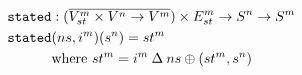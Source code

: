 \documentclass[preview]{standalone}
\begin{document}
\begin{align*}
  \texttt{stated} &: (\overline{V^m_{st} \times V^n \rightarrow V^m}) \times E^m_{st} \rightarrow S^n \rightarrow S^m \\
  \texttt{stated} &(ns,i^m)(s^n) = st^m \\
                 &\text{where}\ st^m = i^m \mathbin{\Delta} ns \oplus (st^m, s^n) 
\end{align*}
\end{document}

